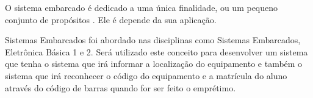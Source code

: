 O sistema embarcado é dedicado a uma única finalidade, ou um pequeno conjunto de propósitos \cite{embarcado2}. Ele é depende da sua aplicação. 

Sistemas Embarcados foi abordado nas disciplinas como Sistemas Embarcados, Eletrônica Básica 1 e 2. Será utilizado este conceito para desenvolver um sistema que tenha o sistema que irá informar a localização do equipamento e também o sistema que irá reconhecer o código do equipamento e a matrícula do aluno através do código de barras quando for ser feito o emprétimo. 

